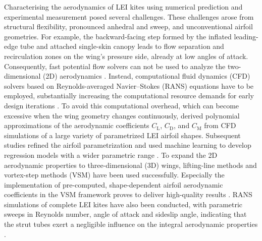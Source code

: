 \documentclass[wes, manuscript]{copernicus}
\begin{document}
Characterising the aerodynamics of LEI kites using numerical prediction and experimental measurement posed several challenges. These challenges arose from structural flexibility, pronounced anhedral and sweep, and unconventional airfoil geometries. For example, the backward-facing step formed by the inflated leading-edge tube and attached single-skin canopy leads to flow separation and recirculation zones on the wing's pressure side, already at low angles of attack. Consequently, fast potential flow solvers can not be used to analyze the two-dimensional (2D) aerodynamics \citep{Poland2025b}. Instead, computational fluid dynamics (CFD) solvers based on Reynolds-averaged Navier–Stokes (RANS) equations have to be employed, substantially increasing the computational resource demands for early design iterations \citep{Folkersma2019}. To avoid this computational overhead, which can become excessive when the wing geometry changes continuously, \cite{Breukels2011} derived polynomial approximations of the aerodynamic coefficients $C_\textrm{L}$, $C_\textrm{D}$, and $C_\textrm{M}$ from CFD simulations of a large variety of parametrized LEI airfoil shapes. Subsequent studies refined the airfoil parametrization and used machine learning to develop regression models with a wider parametric range \citep{Watchorn2023,Masure2025}.
To expand the 2D aerodynamic properties to three-dimensional (3D) wings, lifting-line methods \citep{Gaunaa2011,Leloup2013} and vortex-step methods (VSM) \citep{Damiani2019,Cayon2023} have been used successfully. 
Especially the implementation of pre-computed, shape-dependent airfoil aerodynamic coefficients in the VSM framework proves to deliver high-quality results \citep{Poland2025b}.
RANS simulations of complete LEI kites have also been conducted, with parametric sweeps in Reynolds number, angle of attack and sideslip angle, indicating that the strut tubes exert a negligible influence on the integral aerodynamic properties \citep{Vire2020,Vire2022}.
\end{document}
